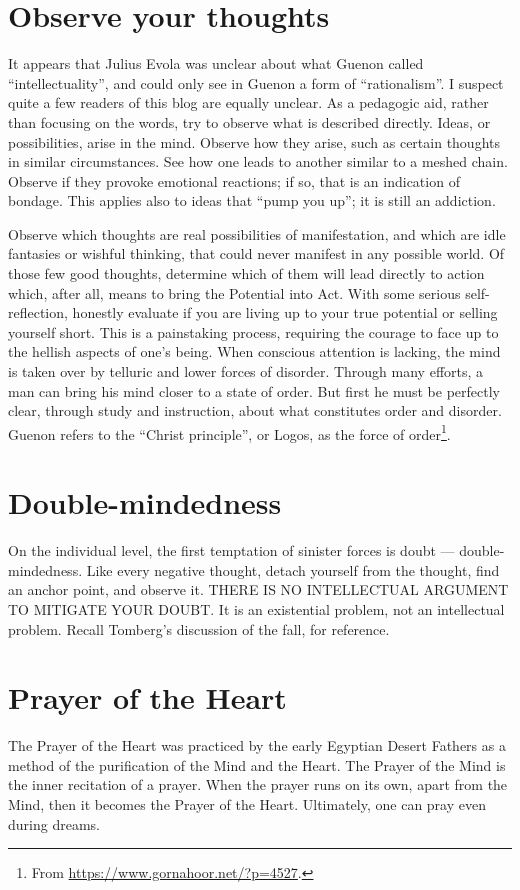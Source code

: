 \section{Observe your thoughts}

It appears that Julius Evola was unclear about what Guenon called “intellectuality”, and could only see in Guenon a form of “rationalism”. 
I suspect quite a few readers of this blog are equally unclear. 
As a pedagogic aid, rather than focusing on the words, try to observe what is described directly. 
Ideas, or possibilities, arise in the mind. 
Observe how they arise, such as certain thoughts in similar circumstances. 
See how one leads to another similar to a meshed chain. 
Observe if they provoke emotional reactions; if so, that is an indication of bondage. 
This applies also to ideas that “pump you up”; it is still an addiction.

Observe which thoughts are real possibilities of manifestation, and which are idle fantasies or wishful thinking, that could never manifest in any possible world. 
Of those few good thoughts, determine which of them will lead directly to action which, after all, means to bring the Potential into Act.
With some serious self-reflection, honestly evaluate if you are living up to your true potential or selling yourself short. 
This is a painstaking process, requiring the courage to face up to the hellish aspects of one’s being. 
When conscious attention is lacking, the mind is taken over by telluric and lower forces of disorder. 
Through many efforts, a man can bring his mind closer to a state of order. 
But first he must be perfectly clear, through study and instruction, about what constitutes order and disorder. 
Guenon refers to the “Christ principle”, or Logos, as the force of order\footnote{From \url{https://www.gornahoor.net/?p=4527}.}.

\section{Double-mindedness}

On the individual level, the first temptation of sinister forces is doubt — double-mindedness. Like every negative thought, detach yourself from the thought, find an anchor point, and observe it. THERE IS NO INTELLECTUAL ARGUMENT TO MITIGATE YOUR DOUBT. It is an existential problem, not an intellectual problem. Recall Tomberg's discussion of the fall, for reference.

\section{Prayer of the Heart}
The Prayer of the Heart was practiced by the early Egyptian Desert Fathers as a method of the purification of the Mind and the Heart. The Prayer of the Mind is the inner recitation of a prayer. When the prayer runs on its own, apart from the Mind, then it becomes the Prayer of the Heart. Ultimately, one can pray even during dreams.

